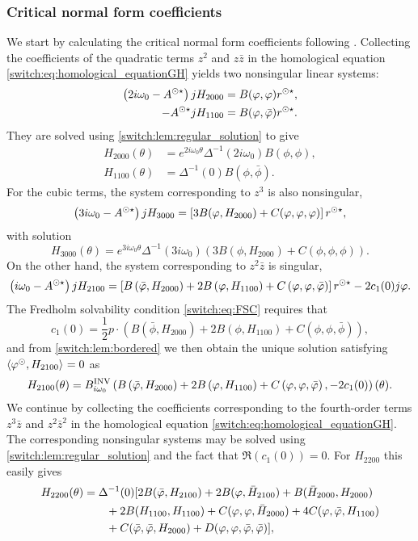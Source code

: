 \subsubsection{Critical normal form coefficients}
We start by calculating the critical normal form coefficients following \cite{Janssens:Thesis}. Collecting the coefficients of the quadratic terms $z^{2}$ and $z\bar{z}$ in the homological equation \cref{switch:eq:homological_equationGH} yields two nonsingular linear systems:
\begin{align*}
\left(2i\omega_{0}-A^{\odot\star}\right) jH_{2000}  &= B(\varphi,\varphi) r^{\odot\star} , \\
-A^{\odot\star}jH_{1100} &= B(\varphi,\bar{\varphi}) r^{\odot\star} .
\end{align*}
They are solved using \cref{switch:lem:regular_solution} to give
\begin{align*}
H_{2000}(\theta) & =e^{2i\omega_{0}\theta}\Delta^{-1}(2i\omega_0)B(\phi,\phi),\\
H_{1100}(\theta) & =\Delta^{-1}(0)B(\phi,\bar{\phi}).
\end{align*}
For the cubic terms, the system corresponding to $z^3$ is also nonsingular,
\[
\left(3i\omega_{0}-A^{\odot\star}\right) jH_{3000} = \left[ 3B(\varphi,H_{2000})+C(\varphi,\varphi,\varphi) \right] r^{\odot\star},
\]
with solution
\[
  H_{3000}(\theta) =e^{3i\omega_{0}\theta}\Delta^{-1}(3i\omega_0)\left(3B\left(\phi,H_{2000}\right)+C\left(\phi,\phi,\phi\right)\right).
\]
On the other hand, the system corresponding to $z^2\bar{z}$ is singular,
\[
  \left(i\omega_{0}-A^{\odot\star}\right) jH_{2100} = \left[  B\left(\bar{\varphi},H_{2000}\right)+2B\left(\varphi,H_{1100}\right)+C\left(\varphi,\varphi,\bar{\varphi}\right) \right] r^{\odot\star}-2c_{1}(0) j\varphi.
\]
The Fredholm solvability condition \cref{switch:eq:FSC} requires that
\[
c_1(0)=\frac{1}{2} p \cdot \left(B\left(\bar{\phi},H_{2000}\right)+2B\left(\phi,H_{1100}\right)+C\left(\phi,\phi,\bar{\phi}\right)\right),
\]
and from \cref{switch:lem:bordered} we then obtain the unique solution satisfying $\langle \varphi^{\odot},H_{2100} \rangle_{} = 0$ as
\[
H_{2100}(\theta) = B^{\mathrm{INV}}_{i\omega_{0}}\left( B\left(\bar{\varphi},H_{2000}\right)+2B\left(\varphi,H_{1100}\right)+C\left(\varphi,\varphi,\bar{\varphi}\right),-2c_1(0)\right)(\theta).
\]
We continue by collecting the coefficients corresponding to the fourth-order terms $z^{3}\bar{z}$ and $z^{2}\bar{z}^{2}$ in the homological equation \cref{switch:eq:homological_equationGH}. The corresponding nonsingular systems may be solved using \cref{switch:lem:regular_solution} and the fact that $\Re(c_1(0))=0$. For $H_{2200}$ this easily gives
\begin{align*}
  H_{2200}(\theta) &= \Delta^{-1}(0)[2B(\bar{\varphi},H_{2100})  + 2B(\varphi,\bar{H}_{2100}) + B(\bar{H}_{2000},H_{2000})\\
                   & \qquad + 2B(H_{1100},H_{1100}) + C(\varphi,\varphi,\bar{H}_{2000}) + 4C(\varphi,\bar{\varphi},H_{1100}) \\
                   & \qquad + C(\bar{\varphi},\bar{\varphi},H_{2000}) +  D(\varphi,\varphi,\bar{\varphi},\bar{\varphi})],
\end{align*}
